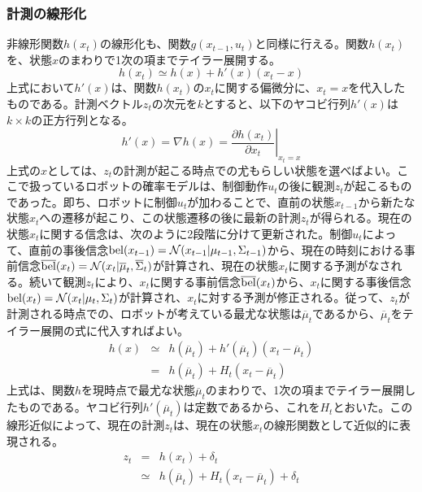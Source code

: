 \documentclass[dvipdfmx,a4paper]{jsarticle}
\begin{document}
\subsubsection{計測の線形化}
非線形関数$h(x_t)$の線形化も、関数$g(x_{t - 1}, u_t)$と同様に行える。関数$h(x_t)$を、状態$x$のまわりで1次の項までテイラー展開する。
\begin{equation}
	h(x_t) \simeq h(x) + h'(x) \left( x_t - x \right)
\end{equation}
上式において$h'(x)$は、関数$h(x_t)$の$x_t$に関する偏微分に、$x_t = x$を代入したものである。計測ベクトル$z_t$の次元を$k$とすると、以下のヤコビ行列$h'(x)$は$k \times k$の正方行列となる。
\begin{equation}
	h'(x) = \nabla h(x) = \left. \frac{\partial h(x_t)}{\partial x_t} \right|_{x_t = x}
\end{equation}
上式の$x$としては、$z_t$の計測が起こる時点での尤もらしい状態を選べばよい。ここで扱っているロボットの確率モデルは、制御動作$u_t$の後に観測$z_t$が起こるものであった。即ち、ロボットに制御$u_t$が加わることで、直前の状態$x_{t - 1}$から新たな状態$x_t$への遷移が起こり、この状態遷移の後に最新の計測$z_t$が得られる。現在の状態$x_t$に関する信念は、次のように2段階に分けて更新された。制御$u_t$によって、直前の事後信念$\operatorname{bel}(x_{t - 1}) = \mathcal{N}(x_{t - 1} | \mu_{t - 1}, \Sigma_{t - 1})$から、現在の時刻における事前信念$\operatorname{\overline{bel}}(x_t) = \mathcal{N}(x_t | \overline{\mu}_t, \overline{\Sigma}_t)$が計算され、現在の状態$x_t$に関する予測がなされる。続いて観測$z_t$により、$x_t$に関する事前信念$\operatorname{\overline{bel}}(x_t)$から、$x_t$に関する事後信念$\operatorname{bel}(x_t) = \mathcal{N}(x_t | \mu_t, \Sigma_t)$が計算され、$x_t$に対する予測が修正される。従って、$z_t$が計測される時点での、ロボットが考えている最尤な状態は$\overline{\mu}_t$であるから、$\overline{\mu}_t$をテイラー展開の式に代入すればよい。
\begin{eqnarray}
	h(x) &\simeq& h(\overline{\mu}_t) + h'(\overline{\mu}_t) \left( x_t - \overline{\mu}_t \right) \\
	&=& h(\overline{\mu}_t) + H_t \left( x_t - \overline{\mu}_t \right)
\end{eqnarray}
上式は、関数$h$を現時点で最尤な状態$\overline{\mu}_t$のまわりで、1次の項までテイラー展開したものである。ヤコビ行列$h'(\overline{\mu}_t)$は定数であるから、これを$H_t$とおいた。この線形近似によって、現在の計測$z_t$は、現在の状態$x_t$の線形関数として近似的に表現される。
\begin{eqnarray}
	z_t &=& h(x_t) + \delta_t \nonumber \\
	&\simeq& h(\overline{\mu}_t) + H_t \left( x_t - \overline{\mu}_t \right) + \delta_t
\end{eqnarray}
\end{document}
